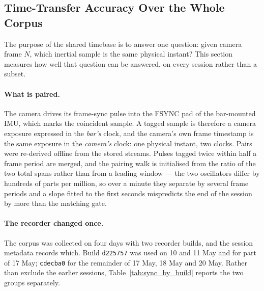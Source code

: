 
\subsection{Time-Transfer Accuracy Over the Whole Corpus}\label{sec:sync_measured}

The purpose of the shared timebase is to answer one question: given camera frame $N$,
which inertial sample is the same physical instant? This section measures how well that
question can be answered, on every session rather than a subset.

\paragraph{What is paired.} The camera drives its frame-sync pulse into the FSYNC pad of
the bar-mounted IMU, which marks the coincident sample. A tagged sample is therefore a
camera exposure expressed in the \emph{bar's} clock, and the camera's own frame timestamp
is the same exposure in the \emph{camera's} clock: one physical instant, two clocks. Pairs
were re-derived offline from the stored streams. Pulses tagged twice within half a frame
period are merged, and the pairing walk is initialised from the ratio of the two total
spans rather than from a leading window --- the two oscillators differ by hundreds of
parts per million, so over a minute they separate by several frame periods and a slope
fitted to the first seconds mispredicts the end of the session by more than the matching
gate.

\paragraph{The recorder changed once.} The corpus was collected on four days with two
recorder builds, and the session metadata records which. Build \texttt{d225757} was used
on 10 and 11 May and for part of 17 May; \texttt{cdecba0} for the remainder of 17 May, 18
May and 20 May. Rather than exclude the earlier sessions, Table~\ref{tab:sync_by_build}
reports the two groups separately.

